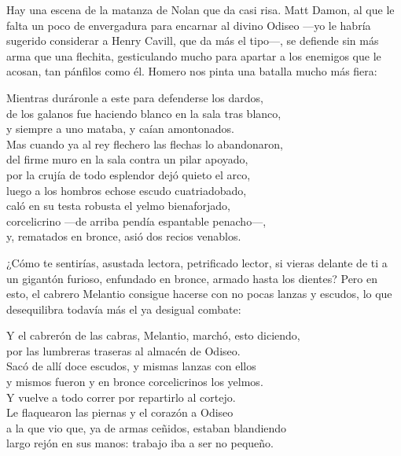 Hay una escena de la matanza de Nolan que da casi risa. Matt Damon, al que le falta un poco de envergadura para encarnar al divino Odiseo ---yo le habría sugerido considerar a Henry Cavill, que da más el tipo---, se defiende sin más arma que una flechita, gesticulando mucho para apartar a los enemigos que le acosan, tan pánfilos como él. Homero nos pinta una batalla mucho más fiera:

\begin{versocita}
Mientras duráronle a este para defenderse los dardos,\\
de los galanos fue haciendo blanco en la sala tras blanco,\\
y siempre a uno mataba, y caían amontonados.\\
Mas cuando ya al rey flechero las flechas lo abandonaron,\\
del firme muro en la sala contra un pilar apoyado,\\
por la crujía de todo esplendor dejó quieto el arco,\\
luego a los hombros echose escudo cuatriadobado,\\
caló en su testa robusta el yelmo bienaforjado,\\
corcelicrino ---de arriba pendía espantable penacho---,\\
y, rematados en bronce, asió dos recios venablos.
\end{versocita}

¿Cómo te sentirías, asustada lectora, petrificado lector, si vieras delante de ti a un gigantón furioso, enfundado en bronce, armado hasta los dientes? Pero en esto, el cabrero Melantio consigue hacerse con no pocas lanzas y escudos, lo que desequilibra todavía más el ya desigual combate:

\begin{versocita}
Y el cabrerón de las cabras, Melantio, marchó, esto diciendo,\\
por las lumbreras traseras al almacén de Odiseo.\\
Sacó de allí doce escudos, y mismas lanzas con ellos\\
y mismos fueron y en bronce corcelicrinos los yelmos.\\
Y vuelve a todo correr por repartirlo al cortejo.\\
Le flaquearon las piernas y el corazón a Odiseo\\
a la que vio que, ya de armas ceñidos, estaban blandiendo\\
largo rejón en sus manos: trabajo iba a ser no pequeño.
\end{versocita}

